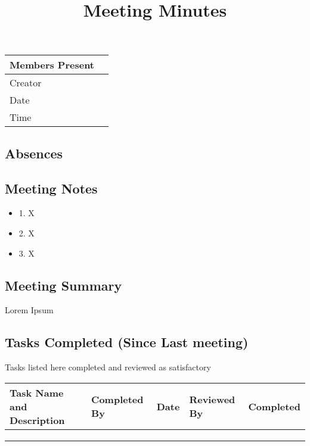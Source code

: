 \documentclass{article}
\title{Meeting Minutes}
\date{}
\begin{document}
\maketitle

\begin{center}
    \begin{tabular}{ | l | p{14cm} |}
    \hline
    Members Present & \\ \hline
    Creator         & \\ \hline
    Date            & \\ \hline
    Time            & \\ \hline
    \end{tabular}
\end{center}

\subsection{Absences}

\subsection{Meeting Notes}
\begin{itemize}
    \item 1. X
    \item 2. X
    \item 3. X
\end{itemize}

\subsection{Meeting Summary}

Lorem Ipsum

\subsection{Tasks Completed (Since Last meeting)}
Tasks listed here completed and reviewed as satisfactory
\begin{center}
    \begin{tabular}{|p{9cm}|l|l|l|l|}
    \hline
    Task Name and Description & Completed By & Date & Reviewed By & Completed \\ \hline
                              &              &      &             &           \\ \hline
                              &              &      &             &           \\ \hline
                              &              &      &             &           \\ \hline
    \end{tabular}
    \end{center}
\end{document}
